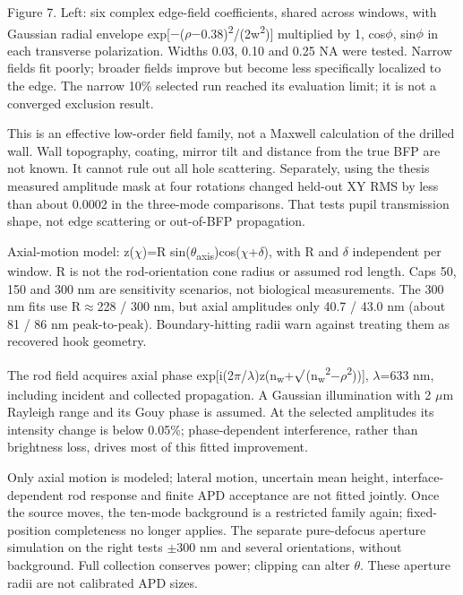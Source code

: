 \documentclass[10pt,a4paper]{article}
\begin{document}
Figure 7. Left: six complex edge-field coefficients, shared across windows, with Gaussian radial envelope exp[\(-\)(\(ρ\)\(-\)0.38)\textsuperscript{2}/(2w\textsuperscript{2})] multiplied by 1, cos\(ϕ\), sin\(ϕ\) in each transverse polarization. Widths 0.03, 0.10 and 0.25 NA were tested. Narrow fields fit poorly; broader fields improve but become less specifically localized to the edge. The narrow 10\% selected run reached its evaluation limit; it is not a converged exclusion result.\par
This is an effective low-order field family, not a Maxwell calculation of the drilled wall. Wall topography, coating, mirror tilt and distance from the true BFP are not known. It cannot rule out all hole scattering. Separately, using the thesis measured amplitude mask at four rotations changed held-out XY RMS by less than about 0.0002 in the three-mode comparisons. That tests pupil transmission shape, not edge scattering or out-of-BFP propagation.\par
Axial-motion model: z(\(χ\))=R sin(\(θ\)\textsubscript{axis})cos(\(χ\)+\(δ\)), with R and \(δ\) independent per window. R is not the rod-orientation cone radius or assumed rod length. Caps 50, 150 and 300 nm are sensitivity scenarios, not biological measurements. The 300 nm fits use R\(\approx\)228 / 300 nm, but axial amplitudes only 40.7 / 43.0 nm (about 81 / 86 nm peak-to-peak). Boundary-hitting radii warn against treating them as recovered hook geometry.\par
The rod field acquires axial phase exp[i(2\(π\)/\(λ\))z(n\textsubscript{w}+\(\surd\)(n\textsubscript{w}\textsuperscript{2}\(-\)\(ρ\)\textsuperscript{2}))], \(λ\)=633 nm, including incident and collected propagation. A Gaussian illumination with 2 \(\mu\)m Rayleigh range and its Gouy phase is assumed. At the selected amplitudes its intensity change is below 0.05\%; phase-dependent interference, rather than brightness loss, drives most of this fitted improvement.\par
Only axial motion is modeled; lateral motion, uncertain mean height, interface-dependent rod response and finite APD acceptance are not fitted jointly. Once the source moves, the ten-mode background is a restricted family again; fixed-position completeness no longer applies. The separate pure-defocus aperture simulation on the right tests \(\pm\)300 nm and several orientations, without background. Full collection conserves power; clipping can alter \(θ\). These aperture radii are not calibrated APD sizes.\par
\clearpage
\end{document}
